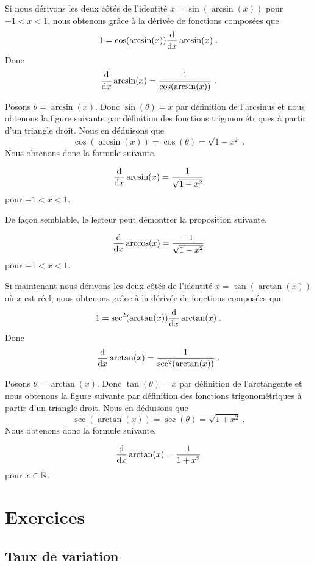 {Si nous dérivons les deux côtés de l'identité $x = \sin (\arcsin(x))$ pour
$-1 < x < 1$, nous obtenons grâce à la dérivée de fonctions composées que
\[
1 = \cos(\arcsin(x)) \dfdx{\arcsin(x)}{x} \; .
\]
Donc
\[
\dfdx{\arcsin(x)}{x} = \frac{1}{\cos(\arcsin(x))} \; .
\]

Posons $\theta = \arcsin(x)$.  Donc $\sin(\theta) = x$ par définition
de l'arcsinus et nous obtenons la figure suivante par définition des
fonctions trigonométriques à partir d'un triangle droit.
Nous en déduisons que
\[
\cos(\arcsin(x)) = \cos(\theta) = \sqrt{1-x^2} \; .
\]
Nous obtenons donc la formule suivante.

\begin{focus}{\prp}
\[
\dfdx{\arcsin(x)}{x} = \frac{1}{\sqrt{1-x^2}}
\]
pour $-1<x<1$.
\end{focus}

De façon semblable, le lecteur peut démontrer la proposition suivante.

\begin{focus}{\prp}
\[
\dfdx{\arccos(x)}{x} = \frac{-1}{\sqrt{1-x^2}}
\]
pour $-1<x<1$.
\end{focus}

Si maintenant nous dérivons les deux côtés de l'identité
$x = \tan (\arctan(x))$
où $x$ est réel, nous obtenons grâce à la dérivée de fonctions composées que
\[
1 = \sec^2(\arctan(x)) \dfdx{\arctan(x)}{x}\; .
\]
Donc
\[
\dfdx{\arctan(x)}{x} = \frac{1}{\sec^2(\arctan(x))} \; .
\]

Posons $\theta = \arctan(x)$.  Donc $\tan(\theta) = x$ par définition
de l'arctangente et nous obtenons la figure suivante par définition des
fonctions trigonométriques à partir d'un triangle droit.
Nous en déduisons que
\[
\sec(\arctan(x)) = \sec(\theta) = \sqrt{1+x^2} \ .
\]
Nous obtenons donc la formule suivante.

\begin{focus}{\prp}
\[
\dfdx{\arctan(x)}{x} = \frac{1}{1+x^2}
\]
pour $x\in \RR$.
\end{focus}

}  %

\section{Exercices}

\subsection{Taux de variation}

